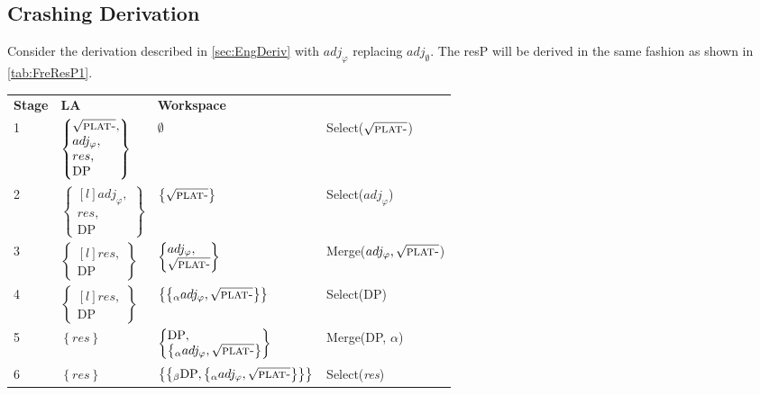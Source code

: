 \documentclass[MilwayThesis]{subfiles}
\begin{document}
\subsection{Crashing Derivation}
Consider the derivation described in \autoref{sec:EngDeriv} with $adj_\varphi$ replacing $adj_\emptyset$.
The resP will be derived in the same fashion as shown in \autoref{tab:FreResP1}.
\begin{longtabu}{llll}
	\textbf{Stage} & \textbf{LA} & \textbf{Workspace} & \\
	1 & $
	\begin{Bmatrix*}[l]
		\sqrt{\textsc{plat-}},\\
		adj_\varphi,\\
		res,\\
		\text{DP}
	\end{Bmatrix*}
	$ & $\emptyset$ & Select($\sqrt{\textsc{plat-}}$)\\
	2 & $
	\begin{Bmatrix*}[l]
		adj_\varphi,\\
		res,\\
		\text{DP}
	\end{Bmatrix*}
	$ & $\left\{\sqrt{\textsc{plat-}}\right\}$ & Select($adj_\varphi$)\\
	3 & $
	\begin{Bmatrix*}[l]
		res,\\
		\text{DP}
	\end{Bmatrix*}
	$ & $
	\begin{Bmatrix*}[l]
		adj_\varphi,\\
		\sqrt{\textsc{plat-}}
	\end{Bmatrix*}$
	& Merge($adj_\varphi, \sqrt{\textsc{plat-}}$)\\
	4 & $
	\begin{Bmatrix*}[l]
		res,\\
		\text{DP}
	\end{Bmatrix*}
	$ & $\left\{ \left\{_\alpha adj_\varphi, \sqrt{\textsc{plat-}} \right\} \right\}$ & Select(DP)\\
	5 & $\left\{ res \right\}$ & $
	\begin{Bmatrix*}[l]
		\text{DP},\\
		\left\{_\alpha adj_\varphi, \sqrt{\textsc{plat-}} \right\}
	\end{Bmatrix*}
	$ & Merge(DP, $\alpha$)\\
	6 & $\left\{ res \right\}$ & $ \left\{ \left\{_\beta \text{DP}, \left\{_\alpha adj_\varphi, \sqrt{\textsc{plat-}} \right\} \right\} \right\}$ &
	Select(\textit{res})\\

\end{longtabu}
\end{document}
